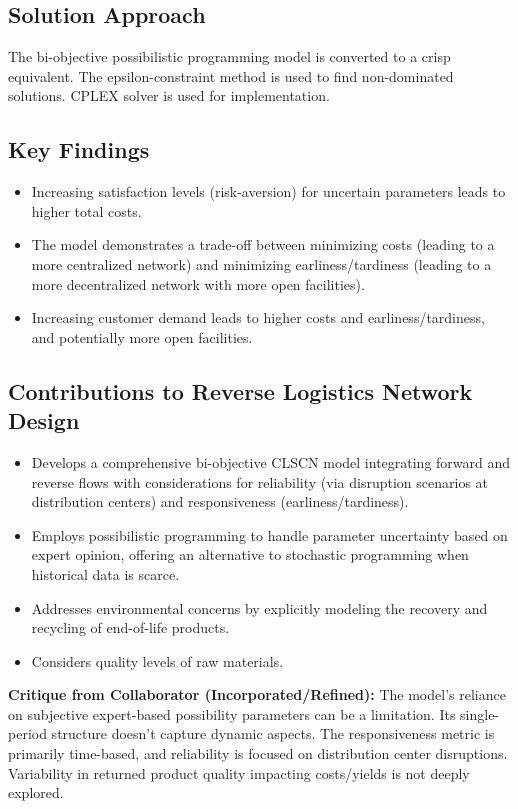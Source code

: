 \subsection*{Solution Approach}
The bi-objective possibilistic programming model is converted to a crisp equivalent. The epsilon-constraint method is used to find non-dominated solutions. CPLEX solver is used for implementation.

\subsection*{Key Findings}
\begin{itemize}
    \item Increasing satisfaction levels (risk-aversion) for uncertain parameters leads to higher total costs.
    \item The model demonstrates a trade-off between minimizing costs (leading to a more centralized network) and minimizing earliness/tardiness (leading to a more decentralized network with more open facilities).
    \item Increasing customer demand leads to higher costs and earliness/tardiness, and potentially more open facilities.
\end{itemize}

\subsection*{Contributions to Reverse Logistics Network Design}
\begin{itemize}
    \item Develops a comprehensive bi-objective CLSCN model integrating forward and reverse flows with considerations for reliability (via disruption scenarios at distribution centers) and responsiveness (earliness/tardiness).
    \item Employs possibilistic programming to handle parameter uncertainty based on expert opinion, offering an alternative to stochastic programming when historical data is scarce.
    \item Addresses environmental concerns by explicitly modeling the recovery and recycling of end-of-life products.
    \item Considers quality levels of raw materials.
\end{itemize}
\textbf{Critique from Collaborator (Incorporated/Refined):} The model's reliance on subjective expert-based possibility parameters can be a limitation. Its single-period structure doesn't capture dynamic aspects. The responsiveness metric is primarily time-based, and reliability is focused on distribution center disruptions. Variability in returned product quality impacting costs/yields is not deeply explored.